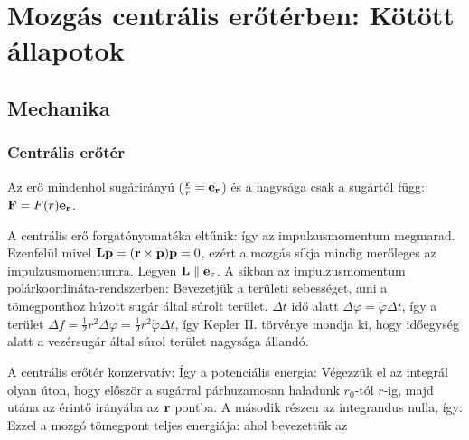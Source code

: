 \chapter{Mozg\'as centr\'alis er\H{o}t\'erben: K\"ot\"ott \'allapotok}
 
 \section{Mechanika} 
  
  \subsection{Centrális erőtér}
   
   Az erő mindenhol sugárirányú ($\frac{\mathbf{r}}{r}=\mathbf{e}_{\mathbf{r}}$) és a nagysága csak a sugártól függ: $\mathbf{F}=F(r)\mathbf{e}_{\mathbf{r}}$. 
   
   A centrális erő forgatónyomatéka eltűnik:
   így az impulzusmomentum megmarad. Ezenfelül mivel $\mathbf{L}\mathbf{p}=(\mathbf{r}\times\mathbf{p})\mathbf{p}=0$, ezért a mozgás síkja mindig merőleges az impulzusmomentumra. Legyen $\mathbf{L}\parallel \mathbf{e}_z$. A síkban az impulzusmomentum polárkoordináta-rendszerben:
   Bevezetjük a területi sebességet, ami a tömegponthoz húzott sugár által súrolt terület. $\Delta t$ idő alatt $\Delta\varphi=\dot\varphi \Delta t$, így a terület $\Delta f=\frac{1}{2}r^2\Delta\varphi=\frac{1}{2}r^2\dot\varphi \Delta t$, így
   Kepler II. törvénye mondja ki, hogy időegység alatt a vezérsugár által súrol terület nagysága állandó. 
   
   A centrális erőtér konzervatív:
   Így a potenciális energia:
   Végezzük el az integrál olyan úton, hogy először a sugárral párhuzamosan haladunk $r_0$-tól $r$-ig, majd utána az érintő irányába az $\mathbf{r}$ pontba. A második részen az integrandus nulla, így:
   Ezzel a mozgó tömegpont teljes energiája:
   ahol bevezettük az 
   
